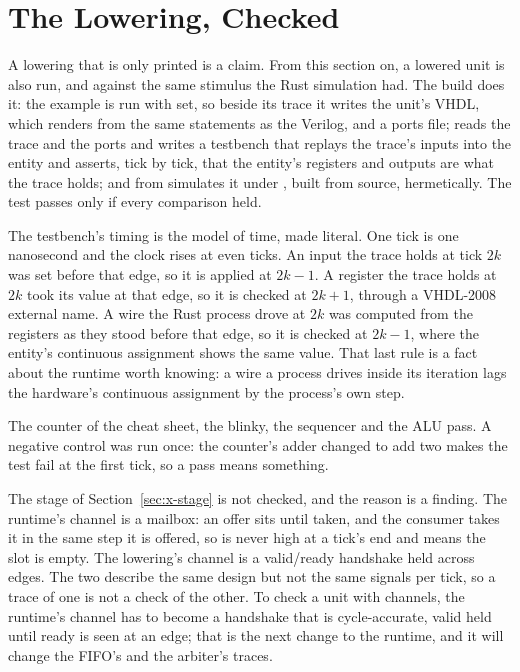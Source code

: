 \section{The Lowering, Checked}
\label{sec:x-checked}

A lowering that is only printed is a claim. From this section on, a
lowered unit is also run, and against the same stimulus the Rust
simulation had. The build does it: the example is run with
 set, so beside its trace it writes the unit's VHDL,
which \code{\#[lower]} renders from the same statements as the
Verilog, and a ports file;  reads the trace and
the ports and writes a testbench that replays the trace's inputs into
the entity and asserts, tick by tick, that the entity's registers and
outputs are what the trace holds; and  from
 simulates it under , built from source,
hermetically. The test passes only if every comparison held.

The testbench's timing is the model of time, made literal. One tick is
one nanosecond and the clock rises at even ticks. An input the trace
holds at tick $2k$ was set before that edge, so it is applied at
$2k-1$. A register the trace holds at $2k$ took its value at that
edge, so it is checked at $2k+1$, through a VHDL-2008 external name.
A wire the Rust process drove at $2k$ was computed from the registers
as they stood before that edge, so it is checked at $2k-1$, where the
entity's continuous assignment shows the same value. That last rule
is a fact about the runtime worth knowing: a wire a process drives
inside its iteration lags the hardware's continuous assignment by the
process's own step.

The counter of the cheat sheet, the blinky, the sequencer and the ALU
pass.
A negative control was run once: the counter's adder changed to add
two makes the test fail at the first tick, so a pass means something.

The stage of Section~\ref{sec:x-stage} is not checked, and the reason
is a finding. The runtime's channel is a mailbox: an offer sits until
taken, and the consumer takes it in the same step it is offered, so
 is never high at a tick's end and  means the
slot is empty. The lowering's channel is a valid/ready handshake held
across edges. The two describe the same design but not the same
signals per tick, so a trace of one is not a check of the other. To
check a unit with channels, the runtime's channel has to become a
handshake that is cycle-accurate, valid held until ready is seen at an
edge; that is the next change to the runtime, and it will change the
FIFO's and the arbiter's traces.
